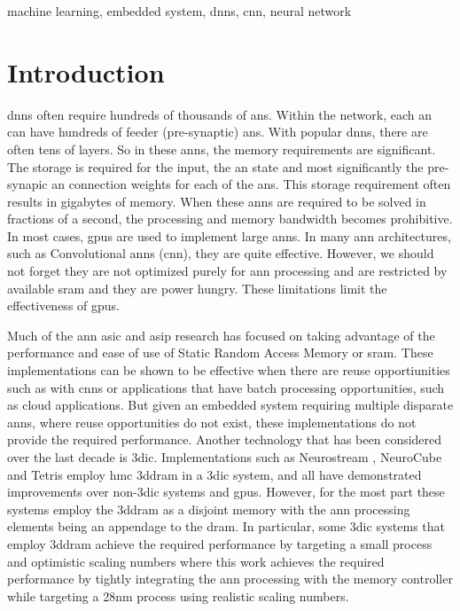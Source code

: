 \documentclass[journal]{IEEEtran}
\begin{document}
\begin{abstract}
\end{abstract}

\begin{IEEEkeywords}
machine learning, embedded system, \acp{dnn}, \ac{cnn}, neural network
\end{IEEEkeywords}

\IEEEpeerreviewmaketitle


\section{Introduction}
 \acp{dnn} often require hundreds of thousands of \acp{an}.
Within the network, each \ac{an} can have hundreds of feeder (pre-synaptic) \acp{an}.
With popular \acp{dnn}, there are often tens of layers. 
So in these \acp{ann}, the memory requirements are significant. The storage is required for the input, the \ac{an} state and most significantly the pre-synapic \ac{an} connection weights for each of the \acp{an}. 
This storage requirement often results in gigabytes of memory.
When these \acp{ann} are required to be solved in fractions of a second, the processing and memory bandwidth becomes prohibitive.
In most cases, \acp{gpu} are used to implement large \acp{ann}. In many \ac{ann} architectures, such as Convolutional \acp{ann} (\ac{cnn}), they are quite effective. 
However, we should not forget they are not optimized purely for \ac{ann} processing and are restricted by available \ac{sram} and they are power hungry. These limitations limit the effectiveness of \acp{gpu}.

Much of the \ac{ann} \ac{asic} and \ac{asip} research has focused on taking advantage of the performance and ease of use of Static Random Access Memory or \ac{sram}. 
These implementations can be shown to be effective when there are reuse opportiunities such as with \acp{cnn} or applications that have batch processing opportunities, such as cloud applications.
But given an embedded system requiring multiple disparate \acp{ann}, where reuse opportunities do not exist, these implementations do not provide the required performance.
Another technology that has been considered over the last decade is \ac{3dic}.
Implementations such as Neurostream \cite{azarkhish2017neurostream}, NeuroCube\cite{kim2016neurocube} and Tetris \cite{gao2017tetris} employ \ac{hmc} \ac{3ddram} in a \ac{3dic} system, 
and all have demonstrated improvements over non-\ac{3dic} systems and \acp{gpu}.
However, for the most part these systems employ the \ac{3ddram} as a disjoint memory with the \ac{ann} processing elements being an appendage to the \ac{dram}.
In particular, some \ac{3dic} systems that employ \ac{3ddram} achieve the required performance by targeting a small process and optimistic scaling numbers where this work achieves the required performance by tightly integrating
the \ac{ann} processing with the memory controller while targeting a 28nm process using realistic scaling numbers.
\end{document}
